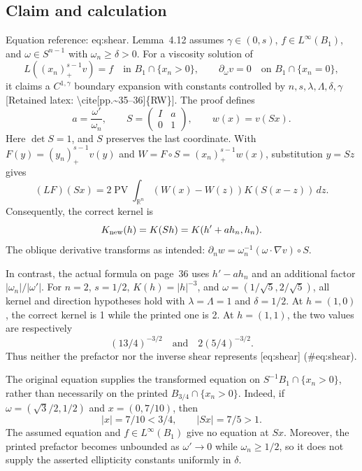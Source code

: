 \documentclass[10pt]{article}
\begin{document}
\subsection*{Claim and calculation}
Equation reference: eq:shear. Lemma 4.12 assumes \(\gamma\in(0,s)\), \(f\in L^\infty(B_1)\), and \(\omega\in S^{n-1}\) with \(\omega_n\ge\delta>0\). For a viscosity solution of \[L((x_n)_+^{s-1}v)=f \quad\text{in }B_1\cap\{x_n>0\},
 \qquad
 \partial_\omega v=0 \quad\text{on }B_1\cap\{x_n=0\},\] it claims a \(C^{1,\gamma}\) boundary expansion with constants controlled by \(n,s,\lambda,\Lambda,\delta,\gamma\) [Retained latex: \textbackslash{}cite[pp.\textasciitilde{}35--36]\{RW\}]. The proof defines \[a=\frac{\omega'}{\omega_n},\qquad
 S=\begin{pmatrix}I&a\\0&1\end{pmatrix},\qquad
 w(x)=v(Sx).\] Here \(\det S=1\), and \(S\) preserves the last coordinate. With \(F(y)=(y_n)_+^{s-1}v(y)\) and \(W=F\circ S=(x_n)_+^{s-1}w(x)\), substitution \(y=Sz\) gives \[
 (LF)(Sx)=2\mathop{\mathrm{PV}}\int_{\mathbb R^n}
       (W(x)-W(z))K(S(x-z))\,dz.\] Consequently, the correct kernel is \[K_{\rm new}(h)=K(Sh)=K(h'+a h_n,h_n).\] The oblique derivative transforms as intended: \(\partial_nw=\omega_n^{-1}(\omega\cdot\nabla v)\circ S\).\par
In contrast, the actual formula on page 36 uses \(h'-a h_n\) and an additional factor \(|\omega_n|/|\omega'|\). For \(n=2\), \(s=1/2\), \(K(h)=|h|^{-3}\), and \(\omega=(1/\sqrt5,2/\sqrt5)\), all kernel and direction hypotheses hold with \(\lambda=\Lambda=1\) and \(\delta=1/2\). At \(h=(1,0)\), the correct kernel is 1 while the printed one is 2. At \(h=(1,1)\), the two values are respectively \[(13/4)^{-3/2}
 \quad\text{and}\quad
 2(5/4)^{-3/2}.\] Thus neither the prefactor nor the inverse shear represents [eq:shear] (\#eq:shear).\par
The original equation supplies the transformed equation on \(S^{-1}B_1\cap\{x_n>0\}\), rather than necessarily on the printed \(B_{3/4}\cap\{x_n>0\}\). Indeed, if \(\omega=(\sqrt3/2,1/2)\) and \(x=(0,7/10)\), then \[|x|=7/10<3/4,\qquad |Sx|=7/5>1.\] The assumed equation and \(f\in L^\infty(B_1)\) give no equation at \(Sx\). Moreover, the printed prefactor becomes unbounded as \(\omega'\to0\) while \(\omega_n\ge1/2\), so it does not supply the asserted ellipticity constants uniformly in \(\delta\).\par
\end{document}
